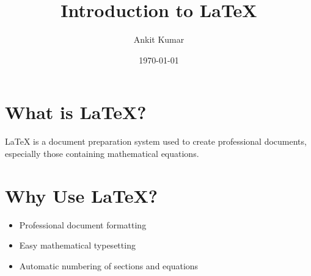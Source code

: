 \documentclass{article}
\title{Introduction to LaTeX}
\author{Ankit Kumar}
\date{\today}
\begin{document}
\maketitle

\section{What is LaTeX?}

LaTeX is a document preparation system used to create
professional documents, especially those containing
mathematical equations.

\section{Why Use LaTeX?}

\begin{itemize}
    \item Professional document formatting
    \item Easy mathematical typesetting
    \item Automatic numbering of sections and equations
\end{itemize}
\end{document}
